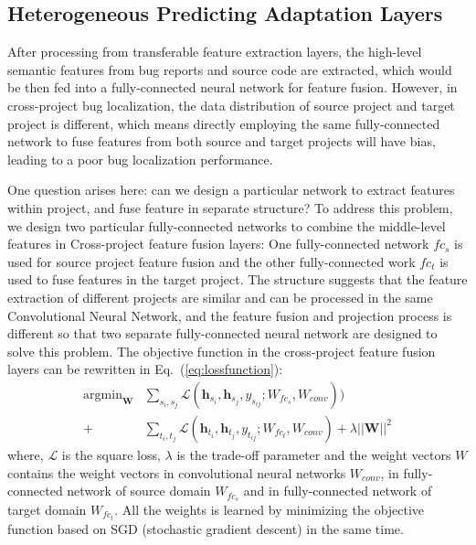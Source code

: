 \subsection{Heterogeneous Predicting Adaptation Layers}
After processing from transferable feature extraction layers, the high-level semantic features from bug reports and source code are extracted, which would be then fed into a fully-connected neural network for feature fusion. However, in cross-project bug localization, the data distribution of source project and target project is different, which means directly employing the same fully-connected network to fuse features from both source and target projects will have bias, leading to a poor bug localization performance.

One question arises here: can we design a particular network to extract features within project, and fuse feature in separate structure? To address this problem, we design two particular fully-connected networks to combine the middle-level features in Cross-project feature fusion layers: One fully-connected network $fc_s$ is used for source project feature fusion and the other fully-connected work $fc_t$ is used to fuse features in the target project. The structure suggests that the feature extraction of different projects are similar and can be processed in the same Convolutional Neural Network, and the feature fusion and projection process is different so that two separate fully-connected neural network are designed to solve this problem. The objective function in the cross-project feature fusion layers can be rewritten in Eq.~(\ref{eq:lossfunction}):
\begin{equation}
\begin{aligned}
\label{eq:lossfunction}
\mathop{\arg\min}_{\mathbf{W}}&\sum_{s_i,s_j}\mathcal{L}(\mathbf{h}_{s_i},\mathbf{h}_{s_j}
,y_{s_{ij}}; W_{fc_s}, W_{conv} ))\\
+&\sum_{t_i,t_j}\mathcal{L}(\mathbf{h}_{t_i},\mathbf{h}_{t_j},y_{t_{ij}}; W_{fc_t}, W_{conv})+\lambda||\mathbf{W}||^2
\end{aligned}
\end{equation}
where, $\mathcal{L}$ is the square loss, $\lambda$ is the trade-off parameter and the weight vectors $W$ contains the weight vectors in convolutional neural networks $W_{conv}$, in fully-connected network of source domain $W_{fc_s}$ and in fully-connected network of target domain $W_{fc_t}$. All the weights is learned by minimizing the objective function based on SGD (stochastic gradient descent) in the same time.


